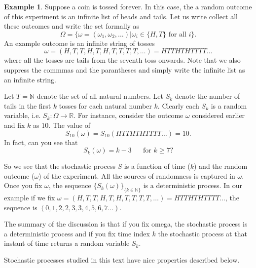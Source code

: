 \documentclass[letterpaper, 12pt]{article}
\newcommand{\1}{\mathds{1}} %
\theoremstyle{definition}
\newtheorem{example}[theorem]{Example}
\begin{document}
\begin{example}
   Suppose a coin is tossed forever. In this case, the a random outcome of this experiment is an infinite list of heads and tails. Let us write collect all these outcomes and write the set formally as \[\Omega = \{\omega = (\omega_1,\omega_2,\ldots)| \omega_i \in \{H,T\}\text{ for all }i\}.\] 
   An example outcome is an infinite string of tosses \[\omega = (H,T,T,H,T,H,T,T,T,T,\ldots)=HTTHTHTTTT\ldots\] where all the tosses are tails from the seventh toss onwards. Note that we also suppress the commmas and the parantheses and simply write the infinite list as an infinite string.

   Let $T=\mathbb{N}$ denote the set of all natural numbers. Let $S_k$ denote the number of tails in the first $k$ tosses for each natural number $k$. Clearly each $S_k$ is a random variable, i.e. $S_k:\Omega \to \mathbb{R}$. For instance, consider the outcome $\omega$ considered earlier and fix $k$ as $10$. The value of \[S_{10}(\omega) = S_{10}(HTTHTHTTTT\ldots) = 10.\] In fact, can you see that \[S_k(\omega) = k-3 \,\,\,\,\,\,\,\, \text{ for }k \geq 7?\]

   So we see that the stochastic process $S$ is a function of time ($k$) and the random outcome ($\omega$) of the experiment. All the sources of randomness is captured in $\omega$. Once you fix $\omega$, the sequence $\{S_k(\omega)\}_{\{k \in \mathbb{N}\}}$ is a deterministic process. In our example if we fix $\omega = (H,T,T,H,T,H,T,T,T,T,\ldots)=HTTHTHTTTT\ldots$, the sequence is $(0,1,2,2,3,3,4,5,6,7\ldots)$.

   The summary of the discussion is that if you fix omega, the stochastic process is a deterministic process and if you fix time index $k$ the stochastic process at that instant of time returns a random variable $S_k$.
 \end{example} 

Stochastic processes studied in this text have nice properties described below.
\end{document}
